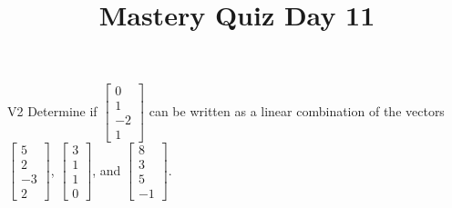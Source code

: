 \documentclass{sbgLAquiz}
\title{Mastery Quiz Day 11 }
\begin{document}
\begin{problem}{V2}
Determine if $\begin{bmatrix} 0 \\ 1 \\ -2 \\ 1 \end{bmatrix}$ can be written as a linear combination of the vectors $\begin{bmatrix} 5 \\ 2 \\ -3 \\ 2 \end{bmatrix}$, $\begin{bmatrix} 3 \\ 1 \\ 1 \\ 0 \end{bmatrix}$, and $\begin{bmatrix} 8 \\ 3 \\ 5 \\ -1 \end{bmatrix}$.
\end{problem}
\end{document}
